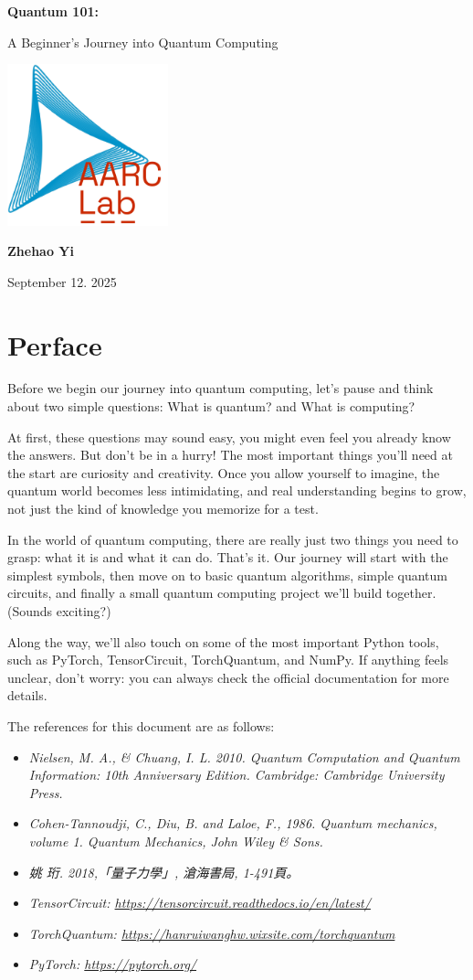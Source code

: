 \documentclass[12pt,oneside]{book}
\newcommand{\makeModernCover}{
\begin{titlepage}

  \vspace*{3cm}
  \begin{center}
    {\Huge\bfseries Quantum 101:\par}
    \vspace{0.8cm}
    {\large A Beginner's Journey into Quantum Computing\par} %

    \vspace{2.5cm}
    \includegraphics[width=0.35\textwidth]{LogoWithText.pdf} %

    \vspace{2.5cm}
    {\Large \textbf{Zhehao Yi}\par}
    \vspace{0.2cm}
    {\large September 12. 2025\par}
  \end{center}
  \vfill
\end{titlepage}
}
\begin{document}
\makeModernCover
\frontmatter
\tableofcontents
\mainmatter

\chapter{Perface}
Before we begin our journey into quantum computing, let's pause and think about two simple questions: What is quantum? and What is computing?

At first, these questions may sound easy, you might even feel you already know the answers. But don't be in a hurry! The most important things you'll need at the start are curiosity and creativity. Once you allow yourself to imagine, the quantum world becomes less intimidating, and real understanding begins to grow, not just the kind of knowledge you memorize for a test.

In the world of quantum computing, there are really just two things you need to grasp: what it is and what it can do. That's it. Our journey will start with the simplest symbols, then move on to basic quantum algorithms, simple quantum circuits, and finally a small quantum computing project we'll build together. (Sounds exciting?)

Along the way, we'll also touch on some of the most important Python tools, such as PyTorch, TensorCircuit, TorchQuantum, and NumPy. If anything feels unclear, don't worry: you can always check the official documentation for more details.

The references for this document are as follows:
\begin{referencebox}[Reference]
  \begin{itemize}
    \item \textit{Nielsen, M. A., \& Chuang, I. L. 2010. Quantum Computation and Quantum Information: 10th Anniversary Edition. Cambridge: Cambridge University Press.}
    \item \textit{Cohen-Tannoudji, C., Diu, B. and Laloe, F., 1986. Quantum mechanics, volume 1. Quantum Mechanics, John Wiley \& Sons.}
    \item \textit{姚 珩. 2018,「量子力學」, 滄海書局, 1-491頁。}
    \item \textit{TensorCircuit: \href{https://tensorcircuit.readthedocs.io/en/latest/}{https://tensorcircuit.readthedocs.io/en/latest/}}
    \item \textit{TorchQuantum: \href{https://hanruiwanghw.wixsite.com/torchquantum}{https://hanruiwanghw.wixsite.com/torchquantum}}
    \item \textit{PyTorch: \href{https://pytorch.org/}{https://pytorch.org/}}
  \end{itemize}
\end{referencebox}
\end{document}
